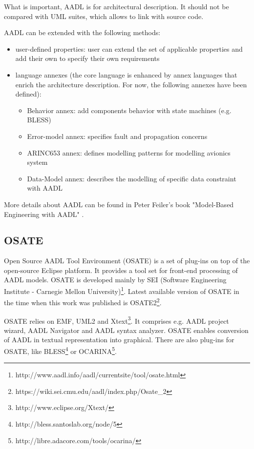 What is important, AADL is for architectural description. It should not be compared with UML suites, which allows to link with source code.

AADL can be extended with the following methods:
\begin{itemize}
	\item user-defined properties: user can extend the set of applicable properties and add their own to specify their own requirements
	\item {language annexes (the core language is enhanced by annex languages that enrich the architecture description. For now, the following annexes have been defined):
		\begin{itemize}
			\item Behavior annex: add components behavior with state machines (e.g. BLESS)
			\item Error-model annex: specifies fault and propagation concerns
			\item ARINC653 annex: defines modelling patterns for modelling avionics system
			\item Data-Model annex: describes the modelling of specific data constraint with AADL
		\end{itemize}
		}
\end{itemize}


More details about AADL can be found in Peter Feiler's book "Model-Based Engineering with AADL" \cite{AadlBook}.


\subsection{OSATE}
\label{background:aadl:osate}

Open Source AADL Tool Environment (OSATE) is a set of plug-ins on top of the open-source Eclipse platform. It provides a tool set for front-end processing of AADL models. OSATE is developed mainly by SEI (Software Engineering Institute - Carnegie Mellon University)\footnote{http://www.aadl.info/aadl/currentsite/tool/osate.html}. Latest available version of OSATE in the time when this work was published is OSATE2\footnote{https://wiki.sei.cmu.edu/aadl/index.php/Osate\_2}. 

OSATE relies on EMF, UML2 and Xtext\footnote{http://www.eclipse.org/Xtext/}. It comprises e.g. AADL project wizard, AADL Navigator and AADL syntax analyzer. OSATE enables conversion of AADL in textual representation into graphical. There are also plug-ins for OSATE, like BLESS\footnote{http://bless.santoslab.org/node/5} or OCARINA\footnote{http://libre.adacore.com/tools/ocarina/}.



